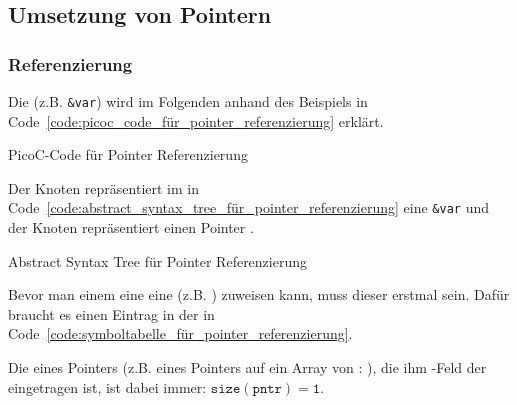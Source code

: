 
\subsection{Umsetzung von Pointern}
\label{sec:umsetzung_von_pointern}
\subsubsection{Referenzierung}
Die  (z.B. \verb|&var|) wird im Folgenden anhand des Beispiels in Code~\ref{code:picoc_code_für_pointer_referenzierung} erklärt.

\begin{code}
  \centering
  \caption{PicoC-Code für Pointer Referenzierung}
  \label{code:picoc_code_für_pointer_referenzierung}
\end{code}

Der Knoten  repräsentiert im  in Code~\ref{code:abstract_syntax_tree_für_pointer_referenzierung} eine  \verb|&var| und der Knoten  repräsentiert einen Pointer .

\begin{code}
  \centering
  \caption{Abstract Syntax Tree für Pointer Referenzierung}
  \label{code:abstract_syntax_tree_für_pointer_referenzierung}
\end{code}

Bevor man einem  eine eine  (z.B. ) zuweisen kann, muss dieser erstmal  sein. Dafür braucht es einen Eintrag in der  in Code~\ref{code:symboltabelle_für_pointer_referenzierung}.

\begin{Special_Paragraph}
Die  eines Pointers (z.B. eines Pointers auf ein Array von : ), die ihm -Feld der  eingetragen ist, ist dabei immer: $\mathtt{size(pntr) = 1}$.
\end{Special_Paragraph}

